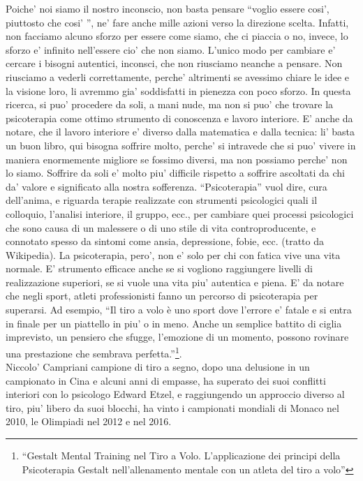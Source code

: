 Poiche' noi siamo il nostro inconscio, non basta pensare ``voglio essere cosi', piuttosto che cosi' '', ne' fare anche mille azioni verso la direzione scelta. Infatti, non facciamo alcuno sforzo per essere come siamo, che ci piaccia o no, invece, lo sforzo e' infinito nell'essere cio' che non siamo. L'unico modo per cambiare e' cercare i bisogni autentici, inconsci, che non riusciamo neanche a pensare. Non riusciamo a vederli correttamente, perche' altrimenti se avessimo chiare le idee e la visione loro, li avremmo gia' soddisfatti in pienezza con poco sforzo. In questa ricerca, si puo' procedere da soli, a mani nude, ma non si puo' che trovare la psicoterapia come ottimo strumento di conoscenza e lavoro interiore. E' anche da notare, che il lavoro interiore e' diverso dalla matematica e dalla tecnica: li' basta un buon libro, qui bisogna soffrire molto, perche' si intravede che si puo' vivere in maniera enormemente migliore se fossimo diversi, ma non possiamo perche' non lo siamo. Soffrire da soli e' molto piu' difficile rispetto a soffrire ascoltati da chi da' valore e significato alla nostra sofferenza.
``Psicoterapia'' vuol dire, cura dell'anima, e riguarda terapie realizzate con strumenti psicologici quali il colloquio, l'analisi interiore, il gruppo, ecc., per cambiare quei processi psicologici che sono causa di un malessere o di uno stile di vita controproducente, e connotato spesso da sintomi come ansia, depressione, fobie, ecc. (tratto da Wikipedia).
La psicoterapia, pero', non e' solo per chi con fatica vive una vita normale. E' strumento efficace anche se si vogliono raggiungere livelli di realizzazione superiori, se si vuole una vita piu' autentica e piena.
E' da notare che negli sport, atleti professionisti fanno un percorso di psicoterapia per superarsi. Ad esempio, ``Il tiro a volo è uno sport dove l’errore e' fatale e si entra in finale per un piattello in piu' o in meno. Anche un semplice battito di ciglia imprevisto, un pensiero che sfugge, l’emozione di un momento, possono rovinare una prestazione che sembrava perfetta.''\footnote{ ``Gestalt Mental Training nel Tiro a Volo. L'applicazione dei principi della Psicoterapia Gestalt nell'allenamento mentale con un atleta del tiro a volo''}.\\
Niccolo' Campriani campione di tiro a segno, dopo una delusione in un campionato in Cina e alcuni anni di empasse, ha superato dei suoi conflitti interiori con lo psicologo Edward Etzel, e raggiungendo un approccio diverso al tiro, piu' libero da suoi blocchi, ha vinto i campionati mondiali di Monaco nel 2010, le Olimpiadi nel 2012 e nel 2016.


